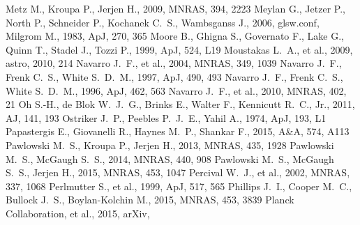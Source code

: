 \documentclass[a4wide,12pt]{book}
\begin{document}
{\begin{thebibliography}{}
 Metz M., Kroupa P., Jerjen H., 2009, MNRAS, 394, 2223
Meylan G., Jetzer P., North P., Schneider P., Kochanek C.~S., Wambsganss 
J., 2006, glsw.conf,  
Milgrom M., 1983, ApJ, 270, 365 
Moore B., Ghigna S., Governato F., Lake G., Quinn T., Stadel J., Tozzi P., 
1999, ApJ, 524, L19 
 Moustakas L.~A., et al., 2009, astro, 
2010, 214 
 Navarro J.~F., et al., 2004, MNRAS, 349, 
1039
 Navarro J.~F., Frenk C.~S., White S.~D.~M., 1997, ApJ, 490, 493
 Navarro J.~F., Frenk C.~S., White S.~D.~M., 1996, ApJ, 462, 563 
 Navarro J.~F., et al., 2010, MNRAS, 402, 
21
 Oh 
S.-H., de Blok W.~J.~G., Brinks E., Walter F., Kennicutt R.~C., Jr., 2011, 
AJ, 141, 193 
 Ostriker J.~P., Peebles P.~J.~E., Yahil A., 1974, ApJ, 193, L1 
 Papastergis E., Giovanelli R., Haynes M.~P., Shankar F., 2015, A\&A, 574, A113 
 Pawlowski M.~S., Kroupa P., Jerjen H., 2013, MNRAS, 435, 1928 
 Pawlowski M.~S., McGaugh S.~S., 2014, MNRAS, 440, 908 
 Pawlowski M.~S., McGaugh S.~S., Jerjen H., 2015, MNRAS, 453, 1047 
 Percival W.~J., et al., 2002, MNRAS, 337, 
1068 
 Perlmutter S., et al., 1999, ApJ, 517, 565 
 Phillips J.~I., Cooper M.~C., Bullock 
J.~S., Boylan-Kolchin M., 2015, MNRAS, 453, 3839 
 Planck Collaboration, et al., 2015, arXiv, 

\end{thebibliography}}
\end{document}
